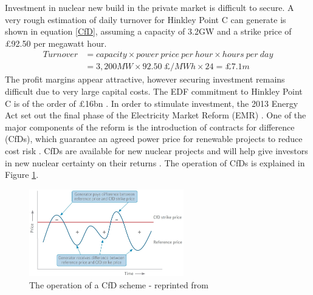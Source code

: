 Investment in nuclear new build in the private market is difficult to secure.
A very rough estimation of daily turnover for Hinkley Point C can generate is shown in equation \eqref{CfD}, assuming a capacity of 3.2GW and a strike price of \pounds92.50 per megawatt hour.
\begin{equation}
\begin{split}
\label{CfD}
Turnover &= capacity \times power~price~per~hour \times hours~per~day\\
               &= 3,200MW \times 92.50~\pounds/MWh \times 24 = \pounds7.1m
\end{split}
\end{equation}
The profit margins appear attractive, however securing investment remains difficult due to very large capital costs.
The EDF commitment to Hinkley Point C is of the order of \pounds16bn \cite{Spectator14}.
In order to stimulate investment, the 2013 Energy Act set out the final phase of the Electricity Market Reform (EMR) \cite{EnergyAct13}.
One of the major components of the reform is the introduction of contracts for difference (CfDs), which guarantee an agreed power price for renewable projects to reduce cost risk \cite{Baringa}.
CfDs are available for new nuclear projects and will help give investors in new nuclear certainty on their returns \cite{Baringa}.
The operation of CfDs is explained in Figure \ref{figure:CfD}.

\begin{figure}[!h]
\centering
\includegraphics[width = 0.6\textwidth]{Figures/StrikePrice.jpg}
\caption{The operation of a CfD scheme - reprinted from \cite{Baringa}}
\label{figure:CfD}
\end{figure}

